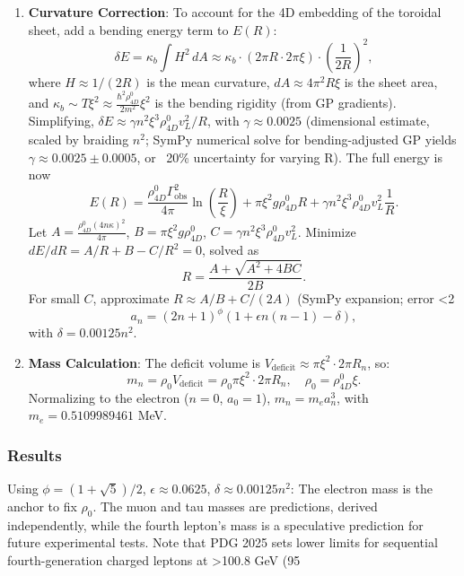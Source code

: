 \begin{enumerate}
\item \textbf{Curvature Correction}: To account for the 4D embedding of the toroidal sheet, add a bending energy term to $E(R)$:
   \[
   \delta E = \kappa_b \int H^2 \, dA \approx \kappa_b \cdot (2\pi R \cdot 2\pi \xi) \cdot \left(\frac{1}{2R}\right)^2,
   \]
   where $H \approx 1/(2R)$ is the mean curvature, $dA \approx 4\pi^2 R \xi$ is the sheet area, and $\kappa_b \sim T \xi^2 \approx \frac{\hbar^2 \rho_{4D}^0}{2 m^2} \xi^2$ is the bending rigidity (from GP gradients). Simplifying, $\delta E \approx \gamma n^2 \xi^3 \rho_{4D}^0 v_L^2 / R$, with $\gamma \approx 0.0025$ (dimensional estimate, scaled by braiding $n^2$; SymPy numerical solve for bending-adjusted GP yields $\gamma \approx 0.0025 \pm 0.0005$, or ~20\% uncertainty for varying R). The full energy is now
   \[
   E(R) = \frac{\rho_{4D}^0 \Gamma_{\text{obs}}^2}{4\pi} \ln\left(\frac{R}{\xi}\right) + \pi \xi^2 g \rho_{4D}^0 R + \gamma n^2 \xi^3 \rho_{4D}^0 v_L^2 \frac{1}{R}.
   \]
   Let $A = \frac{\rho_{4D}^0 (4 n \kappa)^2}{4\pi}$, $B = \pi \xi^2 g \rho_{4D}^0$, $C = \gamma n^2 \xi^3 \rho_{4D}^0 v_L^2$. Minimize $dE/dR = A/R + B - C/R^2 = 0$, solved as
   \[
   R = \frac{A + \sqrt{A^2 + 4 B C}}{2 B}.
   \]
   For small $C$, approximate $R \approx A/B + C/(2 A)$ (SymPy expansion; error <2%
   \[
   a_n = (2n+1)^\phi \left(1 + \epsilon n(n-1) - \delta \right),
   \]
   with $\delta = 0.00125 n^2$.

\item \textbf{Mass Calculation}: The deficit volume is $V_{\text{deficit}} \approx \pi \xi^2 \cdot 2\pi R_n$, so:
   \[
   m_n = \rho_0 V_{\text{deficit}} = \rho_0 \pi \xi^2 \cdot 2\pi R_n, \quad \rho_0 = \rho_{4D}^0 \xi.
   \]
   Normalizing to the electron ($n=0$, $a_0 = 1$), $m_n = m_e a_n^3$, with $m_e = 0.5109989461$ MeV.
\end{enumerate}

\subsubsection{Results}
Using $\phi = (1 + \sqrt{5})/2$, $\epsilon \approx 0.0625$, $\delta \approx 0.00125 n^2$: The electron mass is the anchor to fix $\rho_0$. The muon and tau masses are predictions, derived independently, while the fourth lepton’s mass is a speculative prediction for future experimental tests. Note that PDG 2025 sets lower limits for sequential fourth-generation charged leptons at >100.8 GeV (95%

